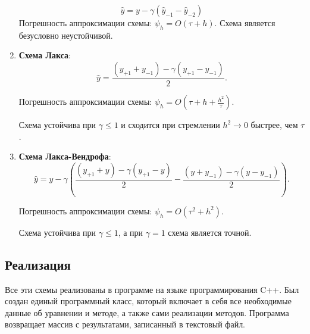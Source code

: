 \documentclass[12pt, a4paper]{article}
\begin{document}
\begin{enumerate}
	
	\begin{equation*}
		\widehat{y} = y - \gamma (\widehat{y}_{-1} - \widehat{y}_{-2})
	\end{equation*}
	Погрешность аппроксимации схемы: $\psi_h = O(\tau + h)$.
	Схема является безусловно неустойчивой.
	
	\item \textbf{Схема Лакса}:
	\bigskip
	\begin{equation*}
		\widehat{y} = \dfrac{(y_{+1} + y_{-1}) - \gamma(y_{+1} - y_{-1})}{2} .
	\end{equation*}
	
	Погрешность аппроксимации схемы: $\psi_h = O(\tau + h + \frac{h^2 }{ \tau})$.
	
	Схема устойчива при $\gamma \leq 1 $ и сходится при стремлении $h^2 \to 0$ быстрее, чем $\tau$.
	\bigskip
	\item \textbf{Схема Лакса-Вендрофа}:
	\begin{equation*}
		\widehat{y} = y - \gamma(\dfrac{(y_{+1} + y) - \gamma (y_{+1} - y)}{2} -  \dfrac{(y + y_{-1}) - \gamma (y - y_{-1})}{2}).
	\end{equation*}
	
	Погрешность аппроксимации схемы: 
	$\psi_h = O(\tau^2 + h^2)$.
	
	Схема устойчива при $\gamma \leq 1 $, а при $\gamma = 1$ схема является точной. 
	
\end{enumerate}

\subsection{Реализация}

Все эти схемы реализованы в программе на языке программирования C++. Был создан единый программный класс, который включает в себя все необходимые данные об уравнении и методе, а также сами реализации методов. Программа возвращает массив с результатами, записанный в текстовый файл.
\end{document}
